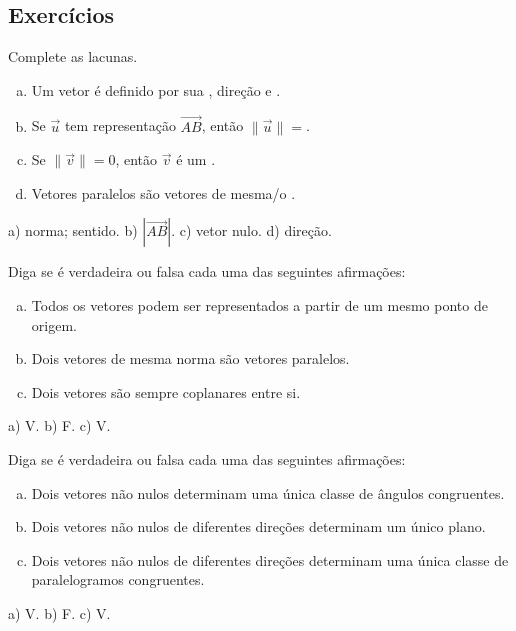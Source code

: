\subsection{Exercícios}

\begin{exer}
  Complete as lacunas.
  \begin{enumerate}[a)]
    \item Um vetor é definido por sua \underline{\phantom{norma}}, direção e \underline{\phantom{sentido}}.
    \item Se $\vec{u}$ tem representação $\overrightarrow{AB}$, então $\|\vec{u}\|=$\underline{}.
    \item Se $\|\vec{v}\|=0$, então $\vec{v}$ é um \underline{\phantom{vetor nulo}}.
    \item Vetores paralelos são vetores de mesma/o \underline{\phantom{direção}}.
  \end{enumerate}
\end{exer}
\begin{resp}
  a) norma; sentido. b) $\left|\overrightarrow{AB}\right|$. c) vetor nulo. d) direção.
\end{resp}

\begin{exer}
  Diga se é verdadeira ou falsa cada uma das seguintes afirmações:
  \begin{enumerate}[a)]
    \item Todos os vetores podem ser representados a partir de um mesmo ponto de origem.
    \item Dois vetores de mesma norma são vetores paralelos.
    \item Dois vetores são sempre coplanares entre si.
  \end{enumerate}
\end{exer}
\begin{resp}
  a) V. b) F. c) V.
\end{resp}

\begin{exer}
  Diga se é verdadeira ou falsa cada uma das seguintes afirmações:
  \begin{enumerate}[a)]
    \item Dois vetores não nulos determinam uma única classe de ângulos congruentes.
    \item Dois vetores não nulos de diferentes direções determinam um único plano.
    \item Dois vetores não nulos de diferentes direções determinam uma única classe de paralelogramos congruentes.
  \end{enumerate}
\end{exer}
\begin{resp}
  a) V. b) F. c) V.
\end{resp}

